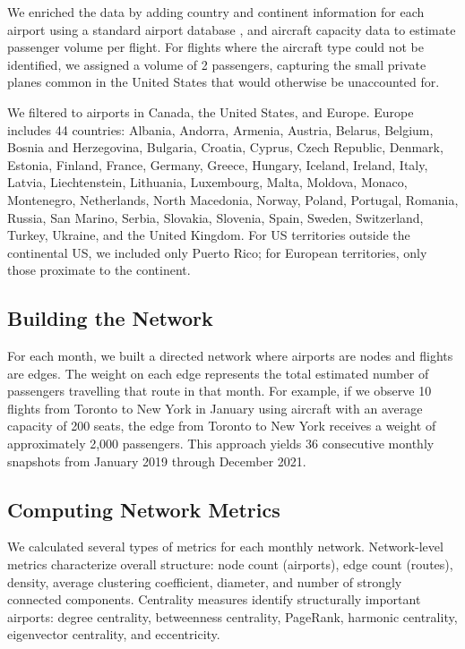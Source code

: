 \documentclass{elsarticle}
\begin{document}
We enriched the data by adding country and continent information for each airport using a standard airport database \cite{airport_code_dataset}, and aircraft capacity data \cite{aircraft_capacity} to estimate passenger volume per flight. For flights where the aircraft type could not be identified, we assigned a volume of 2 passengers, capturing the small private planes common in the United States that would otherwise be unaccounted for.

We filtered to airports in Canada, the United States, and Europe. Europe includes 44 countries: Albania, Andorra, Armenia, Austria, Belarus, Belgium, Bosnia and Herzegovina, Bulgaria, Croatia, Cyprus, Czech Republic, Denmark, Estonia, Finland, France, Germany, Greece, Hungary, Iceland, Ireland, Italy, Latvia, Liechtenstein, Lithuania, Luxembourg, Malta, Moldova, Monaco, Montenegro, Netherlands, North Macedonia, Norway, Poland, Portugal, Romania, Russia, San Marino, Serbia, Slovakia, Slovenia, Spain, Sweden, Switzerland, Turkey, Ukraine, and the United Kingdom. For US territories outside the continental US, we included only Puerto Rico; for European territories, only those proximate to the continent.

\subsection{Building the Network}

For each month, we built a directed network where airports are nodes and flights are edges. The weight on each edge represents the total estimated number of passengers travelling that route in that month. For example, if we observe 10 flights from Toronto to New York in January using aircraft with an average capacity of 200 seats, the edge from Toronto to New York receives a weight of approximately 2,000 passengers. This approach yields 36 consecutive monthly snapshots from January 2019 through December 2021.

\subsection{Computing Network Metrics}

We calculated several types of metrics for each monthly network. Network-level metrics characterize overall structure: node count (airports), edge count (routes), density, average clustering coefficient, diameter, and number of strongly connected components. Centrality measures identify structurally important airports: degree centrality, betweenness centrality, PageRank, harmonic centrality, eigenvector centrality, and eccentricity.
\end{document}
